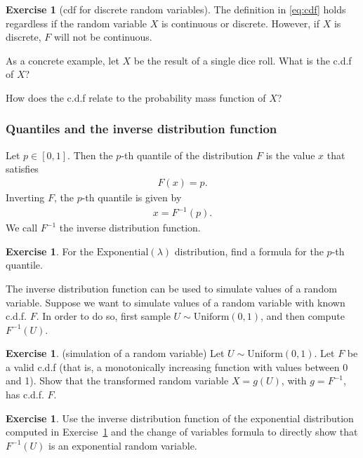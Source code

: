 \documentclass[11pt]{article}
\theoremstyle{definition}
\newtheorem{exercise}[]{Exercise}
\begin{document}
\begin{exercise}[cdf for discrete random variables]
  The definition in \eqref{eq:cdf} holds
  regardless if the random variable $X$ is continuous
  or discrete. However, if $X$ is discrete, $F$
  will not be continuous.

  As a concrete example, let $X$ be the result of a
  single dice roll. What is the c.d.f of $X$?

  How does the c.d.f relate to the probability mass
  function of $X$?

\end{exercise}


\subsubsection*{Quantiles and
the inverse distribution function}

Let $p\in[0, 1]$. Then the $p$-th quantile of
the distribution $F$ is the value $x$ that
satisfies
\begin{align*}
  F(x) = p.
\end{align*}
Inverting $F$, the $p$-th quantile is given by
\begin{align*}
  x = F^{-1}(p).
\end{align*}
We call $F^{-1}$ the inverse distribution function.

\begin{exercise}
  For the $\text{Exponential}(\lambda)$ distribution,
  find a formula for the $p$-th quantile.
  \label{ex:exp_inv_cdf}
\end{exercise}

The inverse distribution function can be used to
simulate values of a random variable.
Suppose we want to simulate values of a random variable
with known c.d.f. $F$.
In order to do so, first sample $U\sim\text{Uniform}(0, 1)$, and then compute $F^{-1}(U)$.

\begin{exercise}(simulation of a random variable)
Let $U\sim\text{Uniform}(0, 1)$.
Let $F$ be a valid c.d.f
(that is, a monotonically increasing function
with values between 0 and 1). Show that
the transformed random variable $X = g(U)$,
with $g = F^{-1}$, has c.d.f. $F$.
\end{exercise}

\begin{exercise}
  Use the inverse distribution function of
  the exponential distribution computed in
  Exercise~\ref{ex:exp_inv_cdf} and the change of
  variables formula to directly show that
  $F^{-1}(U)$ is an exponential random variable.
\end{exercise}
\end{document}
